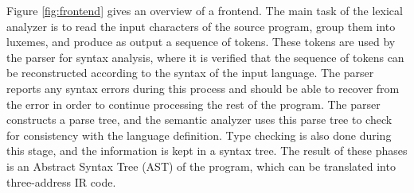 %

%
%
%
%
%
%

Figure \ref{fig:frontend} gives an overview of a frontend. The main task of the lexical analyzer is to read the input characters of the source program, group them into luxemes, and produce as output a sequence of tokens. These tokens are used by the parser for syntax analysis, where it is verified that the sequence of tokens can be reconstructed according to the syntax of the input language. The parser reports any syntax errors during this process and should be able to recover from the error in order to continue processing the rest of the program. The parser constructs a parse tree, and the semantic analyzer uses this parse tree to check for consistency with the language definition. Type checking is also done during this stage, and the information is kept in a syntax tree. The result of these phases is an Abstract Syntax Tree (AST) of the program, which can be translated into three-address IR code. %


